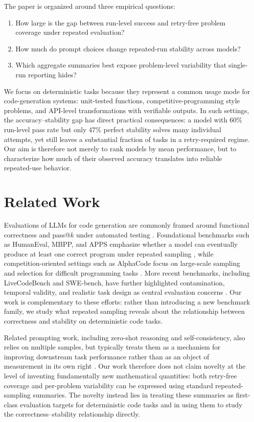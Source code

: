 \documentclass[11pt]{article}
\begin{document}
The paper is organized around three empirical questions:
\begin{enumerate}
  \item How large is the gap between run-level success and retry-free problem coverage under repeated evaluation?
  \item How much do prompt choices change repeated-run stability across models?
  \item Which aggregate summaries best expose problem-level variability that single-run reporting hides?
\end{enumerate}

We focus on deterministic tasks because they represent a common usage mode for code-generation systems: unit-tested functions, competitive-programming style problems, and API-level transformations with verifiable outputs. In such settings, the accuracy--stability gap has direct practical consequences: a model with 60\% run-level pass rate but only 47\% perfect stability solves many individual attempts, yet still leaves a substantial fraction of tasks in a retry-required regime. Our aim is therefore not merely to rank models by mean performance, but to characterize how much of their observed accuracy translates into reliable repeated-use behavior.

\section{Related Work}
Evaluations of LLMs for code generation are commonly framed around functional correctness and pass@$k$ under automated testing \cite{chen2021codex,austin2021program}. Foundational benchmarks such as HumanEval, MBPP, and APPS emphasize whether a model can eventually produce at least one correct program under repeated sampling \cite{chen2021codex,austin2021program,hendrycks2021apps}, while competition-oriented settings such as AlphaCode focus on large-scale sampling and selection for difficult programming tasks \cite{li2022alphacode}. More recent benchmarks, including LiveCodeBench and SWE-bench, have further highlighted contamination, temporal validity, and realistic task design as central evaluation concerns \cite{jain2024livecodebench,jimenez2024swebench}. Our work is complementary to these efforts: rather than introducing a new benchmark family, we study what repeated sampling reveals about the relationship between correctness and stability on deterministic code tasks.

Related prompting work, including zero-shot reasoning and self-consistency, also relies on multiple samples, but typically treats them as a mechanism for improving downstream task performance rather than as an object of measurement in its own right \cite{kojima2022zeroshot,wang2022self}. Our work therefore does not claim novelty at the level of inventing fundamentally new mathematical quantities: both retry-free coverage and per-problem variability can be expressed using standard repeated-sampling summaries. The novelty instead lies in treating these summaries as first-class evaluation targets for deterministic code tasks and in using them to study the correctness--stability relationship directly.
\end{document}
